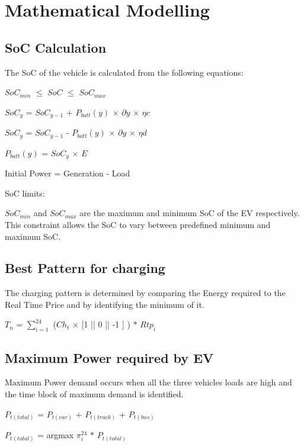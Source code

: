 	\chapter{Mathematical Modelling}
	\label{chap:mathmodel}
	
	\section{SoC Calculation}
	
	
		
	The SoC of the vehicle is calculated from the following equations:
	
	\begin{center}
	
	                             $SoC_{min}$ $\leq$ $SoC$ $\leq$ $SoC_{max}$
	                             
	               $SoC_{y}$ = $SoC_{y-1}$ + $P_{batt}(y)$ $\times$ $\partial y$ $\times$ $\eta c$
	                 
	               $SoC_{y}$ = $SoC_{y-1}$ - $P_{batt}(y)$ $\times$ $\partial y$ $\times$ $\eta d$
	                 
	               $P_{batt}(y)$ = $SoC_{y}$ $\times$ $E$
	               
	  Initial Power = Generation - Load
	\end{center}
	  SoC limits:  
	 
	   $SoC_{min}$ and $SoC_{max}$ are  the maximum and minimum SoC of the EV respectively.
	   This constraint allows the SoC to vary between predefined minimum and maximum SoC.               
	
	\section{Best Pattern for charging}
	
	
	The charging pattern is determined by comparing the Energy required to the Real Time Price and by  identifying the minimum of it. 
	
	\begin{center}
		
		$T_{n}$ = $\sum^{24}_{i=1}$ ($Ch_{t} $ $\times$ [1 || 0 || -1 ] ) $\ast $ $Rtp_{i}$ 
    \end{center}	 
	\section{Maximum Power required by EV}
	
	
	Maximum Power demand occurs when all the three vehicles loads are high and the time block of maximum demand is identified. 
	
	\begin{center}
		
		$P_{t(total)}$ = $P_{t(car)}$ + $P_{t(truck)}$ + $P_{t(bus)}$
		
		$P_{t(total)}$ = argmax $\pi_{i}^{24}$ $\ast$ $P_{t(total)}$
	\end{center} 